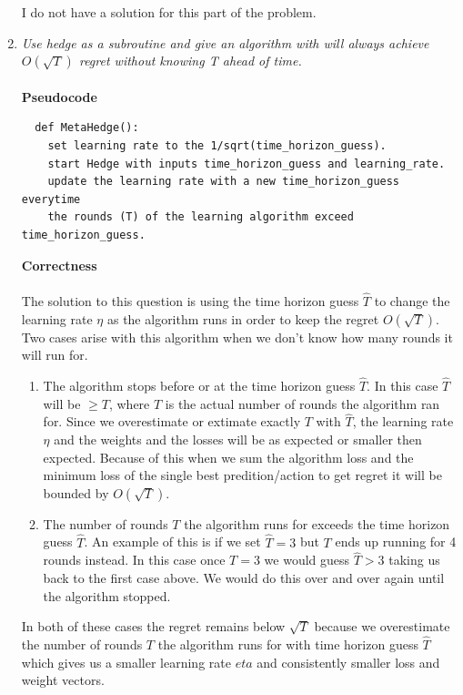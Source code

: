 \documentclass[12pt]{article}
\begin{document}
\begin{enumerate}
  I do not have a solution for this part of the problem.
  
  \newpage
  \item \textit{Use hedge as a subroutine and give an algorithm with will
  always achieve $O(\sqrt{T})$ regret without knowing T ahead of time.}\\
  \\
  \textbf{Pseudocode}\\
  \begin{verbatim}
  def MetaHedge():
    set learning rate to the 1/sqrt(time_horizon_guess).
    start Hedge with inputs time_horizon_guess and learning_rate.
    update the learning rate with a new time_horizon_guess everytime 
    the rounds (T) of the learning algorithm exceed time_horizon_guess. 
  \end{verbatim}
  \textbf{Correctness}\\
  \\
  The solution to this question is using the time horizon guess $\hat{T}$
  to change the learning rate $\eta$ as the algorithm runs in order to keep the
  regret $O(\sqrt{T})$.  Two cases arise with this algorithm when we don't know how many rounds it will run for.
  \begin{enumerate}
    \item The algorithm stops before or at the time horizon guess
    $\hat{T}$.  In this case $\hat{T}$ will be $\ge T$, where $T$ is the
    actual number of rounds the algorithm ran for.  Since we overestimate or
    extimate exactly $T$ with $\hat{T}$, the learning rate $\eta$ and the
    weights and the losses will be as expected or smaller then expected. 
    Because of this when we sum the algorithm loss and the minimum loss of the
    single best predition/action to get regret it will be bounded by
    $O(\sqrt{T})$.
    \item The number of rounds $T$ the algorithm runs for exceeds the time
    horizon guess $\hat{T}$.  An example of this is if we set $\hat{T} = 3$ but
    $T$ ends up running for 4 rounds instead.  In this case once $T=3$ we would
    guess $\hat{T} > 3$ taking us back to the first case above.  We would do
    this over and over again until the algorithm stopped.
  \end{enumerate}
  In both of these cases the regret remains below $\sqrt{T}$ because we
  overestimate the number of rounds $T$ the algorithm runs for with
  time horizon guess $\hat{T}$ which gives us a smaller learning rate $eta$ and
  consistently smaller loss and weight vectors.
  \newpage

\end{enumerate}
\end{document}
